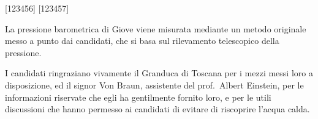 \documentclass[%
corpo=11pt,
twoside,
 stile=classica,
oldstyle,
greek,%
]{toptesi}
\begin{document}



\begin{frontespizio}
\FacoltaDi{}%
\renewcommand*\IDlabel{\\\quad matricola: }%
[123456]%
[123457]%
\end{frontespizio}

\sommario %

 La pressione barometrica di Giove viene misurata
mediante un metodo originale  messo a punto dai candidati, che si basa
sul rilevamento telescopico della pressione.


\ringraziamenti %

I candidati ringraziano vivamente il Granduca di Toscana per i mezzi
messi loro a disposizione, ed il signor Von Braun, assistente del
prof.~Albert Einstein, per le informazioni riservate che egli ha
gentilmente fornito loro, e per le utili discussioni che hanno permesso
ai candidati di evitare di riscoprire l'acqua calda.
\end{document}
